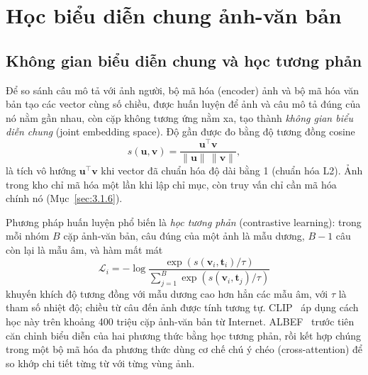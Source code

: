 \section{Học biểu diễn chung ảnh-văn bản}
\label{sec:3.5}

\subsection{Không gian biểu diễn chung và học tương phản}
\label{sec:3.5.1}
\label{sec:3.5.2}

Để so sánh câu mô tả với ảnh người, bộ mã hóa (encoder) ảnh và bộ mã hóa văn bản tạo các vector cùng số chiều, được huấn luyện để ảnh và câu mô tả đúng của nó nằm gần nhau, còn cặp không tương ứng nằm xa, tạo thành \emph{không gian biểu diễn chung} (joint embedding space). Độ gần được đo bằng độ tương đồng cosine
\begin{equation}
    s(\mathbf{u}, \mathbf{v}) = \frac{\mathbf{u}^\top \mathbf{v}}{\lVert \mathbf{u} \rVert \, \lVert \mathbf{v} \rVert},
    \label{eq:cosine}
\end{equation}
là tích vô hướng $\mathbf{u}^\top \mathbf{v}$ khi vector đã chuẩn hóa độ dài bằng 1 (chuẩn hóa L2). Ảnh trong kho chỉ mã hóa một lần khi lập chỉ mục, còn truy vấn chỉ cần mã hóa chính nó (Mục~\ref{sec:3.1.6}).

Phương pháp huấn luyện phổ biến là \emph{học tương phản} (contrastive learning): trong mỗi nhóm $B$ cặp ảnh-văn bản, câu đúng của một ảnh là mẫu dương, $B-1$ câu còn lại là mẫu âm, và hàm mất mát
\begin{equation}
    \mathcal{L}_i = -\log \frac{\exp\left(s(\mathbf{v}_i, \mathbf{t}_i)/\tau\right)}{\sum_{j=1}^{B} \exp\left(s(\mathbf{v}_i, \mathbf{t}_j)/\tau\right)}
    \label{eq:contrastive}
\end{equation}
khuyến khích độ tương đồng với mẫu dương cao hơn hẳn các mẫu âm, với $\tau$ là tham số nhiệt độ; chiều từ câu đến ảnh được tính tương tự. CLIP~\cite{radford2021clip} áp dụng cách học này trên khoảng 400 triệu cặp ảnh-văn bản từ Internet. ALBEF~\cite{li2021albef} trước tiên căn chỉnh biểu diễn của hai phương thức bằng học tương phản, rồi kết hợp chúng trong một bộ mã hóa đa phương thức dùng cơ chế chú ý chéo (cross-attention) để so khớp chi tiết từng từ với từng vùng ảnh.

